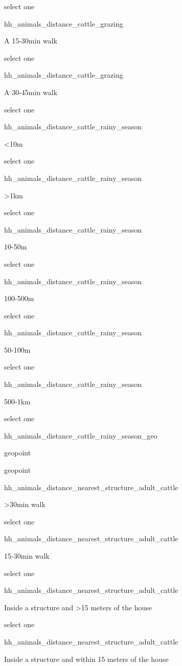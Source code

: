 \documentclass[]{article}
\begin{document}
select one

hh\_animals\_distance\_cattle\_grazing

A 15-30min walk

select one

hh\_animals\_distance\_cattle\_grazing

A 30-45min walk

select one

hh\_animals\_distance\_cattle\_rainy\_season

\textless{}10m

select one

hh\_animals\_distance\_cattle\_rainy\_season

\textgreater{}1km

select one

hh\_animals\_distance\_cattle\_rainy\_season

10-50m

select one

hh\_animals\_distance\_cattle\_rainy\_season

100-500m

select one

hh\_animals\_distance\_cattle\_rainy\_season

50-100m

select one

hh\_animals\_distance\_cattle\_rainy\_season

500-1km

select one

hh\_animals\_distance\_cattle\_rainy\_season\_geo

geopoint

geopoint

hh\_animals\_distance\_nearest\_structure\_adult\_cattle

\textgreater{}30min walk

select one

hh\_animals\_distance\_nearest\_structure\_adult\_cattle

15-30min walk

select one

hh\_animals\_distance\_nearest\_structure\_adult\_cattle

Inside a structure and \textgreater{}15 meters of the house

select one

hh\_animals\_distance\_nearest\_structure\_adult\_cattle

Inside a structure and within 15 meters of the house
\end{document}
